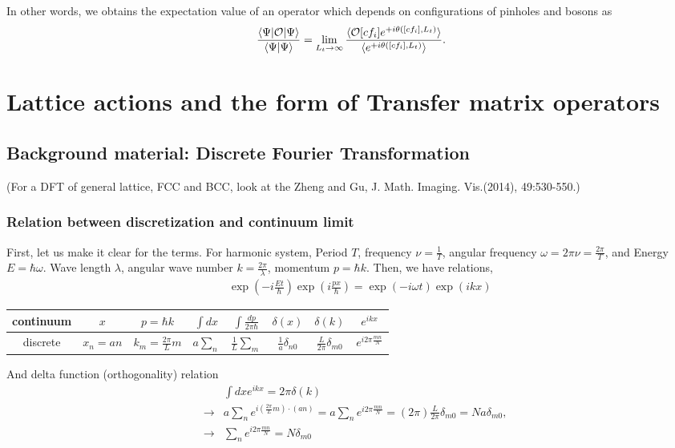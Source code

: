 \documentclass[10pt]{book}
\newcommand{\bea}{\begin{eqnarray}}
\newcommand{\eea}{\end{eqnarray}}
\newcommand{\no}{\nonumber \\}
\def\la{\langle}
\def\ra{\rangle}
\begin{document}
In other words, we obtains the expectation value of an operator which depends on configurations of pinholes and bosons as  
\bea 
\frac{\la \Psi|{\cal O}|\Psi\ra }{\la \Psi|\Psi\ra }
=\lim_{L_t\to \infty} \frac{\la {\cal O}[cf_i] e^{+i\theta([cf_i], L_t) } \ra }{\la e^{+i\theta([cf_i], L_t) } \ra   }. 
\eea 



\newpage
\chapter{Lattice actions and the form of Transfer matrix operators}

\section{Background material: Discrete Fourier Transformation}
(For a DFT of general lattice, FCC and BCC, look at 
the Zheng and Gu, J. Math. Imaging. Vis.(2014), 49:530-550.)

\subsection{Relation between discretization and continuum limit} 

First, let us make it clear for the terms. 
For harmonic system, Period $T$, frequency $\nu=\frac{1}{T}$, 
angular frequency $\omega=2\pi\nu=\frac{2\pi}{T}$, and Energy $E=\hbar\omega$.
Wave length $\lambda$, angular wave number $k=\frac{2\pi}{\lambda}$,
momentum $p=\hbar k$.  Then, we have relations,
\bea 
& &\exp(-i\frac{Et}{\hbar})\exp(i\frac{p x}{\hbar})
  =\exp(-i\omega t)\exp(ik x) 
\eea 
\begin{tabular}{|c|c|c|c|c|c|c|c|}
	\hline 
	continuum &  $x$ & $p=\hbar k$ & $\int dx$ & $\int \frac{dp}{2\pi \hbar}$ 
	& $\delta(x)$ & $\delta(k)$ & $e^{ikx}$
	\\ 
	\hline 
	discrete  & $x_n=a n$ & $k_m=\frac{2\pi}{L}m$ & $a\sum_{n}$ & $\frac{1}{L}\sum_{m}$ 
	& $\frac{1}{a}\delta_{n0}$ & $\frac{L}{2\pi}\delta_{m0}$  & $ e^{i 2\pi \frac{m n}{N}}$
	\\ 
	\hline 
\end{tabular}
 
And delta function (orthogonality) relation 
\bea 
& &\int dx e^{i k x} =2\pi \delta(k) \no 
&\rightarrow&  a\sum_{n} e^{i (\frac{2\pi}{L} m) \cdot (a n)}
             =a \sum_{n} e^{i 2\pi \frac{mn}{N}} = (2\pi)\frac{L}{2\pi}\delta_{m0}
             = N a \delta_{m0}  ,\no 
&\rightarrow& \sum_{n} e^{i 2\pi \frac{mn}{N}} = N \delta_{m 0}               
\eea 
\end{document}
